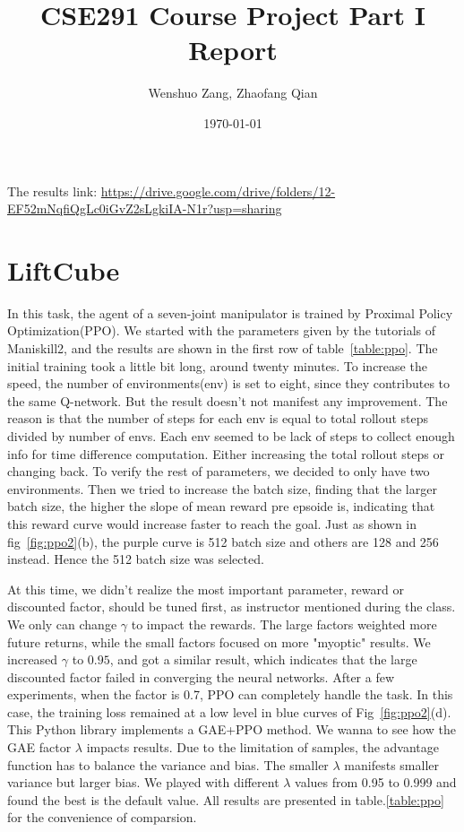 \documentclass[letterpaper,11pt]{article}
\begin{document}
\title{CSE291 Course Project Part I Report}
\author{Wenshuo Zang,  Zhaofang Qian}
\date{\today}
\maketitle
\setlength{\parindent}{20pt}
\vspace{-2em}
{ \scriptsize {The results link: \url{https://drive.google.com/drive/folders/12-EF52mNqfiQgLc0iGvZ2sLgkiIA-N1r?usp=sharing}}}

\section{LiftCube}
In this task, the agent of a seven-joint manipulator is trained by Proximal Policy Optimization(PPO)\cite{ppo}. We started with the 
parameters given by the tutorials of Maniskill2, and the results are shown in the first row of table~\ref{table:ppo}.
The initial training took a little bit long, around twenty minutes. To increase the speed, the number of environments(env)
is set to eight, since they contributes to the same Q-network. But the result doesn't not manifest any improvement.
The reason is that the number of steps for each env is equal to total rollout steps divided by number of envs.
Each env seemed to be lack of steps to collect enough info for time difference computation. Either increasing the 
total rollout steps or changing back. To verify the rest of parameters, we decided to only have two environments.
Then we tried to increase the batch size, finding that the larger batch size, the higher the slope of mean reward pre
epsoide is, indicating that this reward curve would increase faster to reach the goal. Just as shown in fig~\ref{fig:ppo2}(b),
the purple curve is 512 batch size and others are 128 and 256 instead. Hence the 512 batch size was selected.

At this time, we didn't realize the most important parameter, reward or discounted factor, should be tuned first, as
instructor mentioned during the class. We only can change $\gamma$ to impact the rewards. The large factors weighted
more future returns, while the small factors focused on more "myoptic" results. We increased $\gamma$ to $0.95$,
and got a similar result, which indicates that the large discounted factor failed in converging the neural networks.
After a few experiments, when the factor is 0.7, PPO can completely handle the task. In this case, the training loss
remained at a low level in blue curves of Fig~\ref{fig:ppo2}(d). This Python library implements
a GAE+PPO method. We wanna to see how the GAE factor $\lambda$ impacts results. Due to the limitation of samples, 
the advantage function has to balance the variance and bias. The smaller $\lambda$ manifests smaller variance but larger
bias. We played with different $\lambda$ values from 0.95 to 0.999 and found the best is the default value. All results are 
presented in table.\ref{table:ppo} for the convenience of comparsion.
\end{document}
